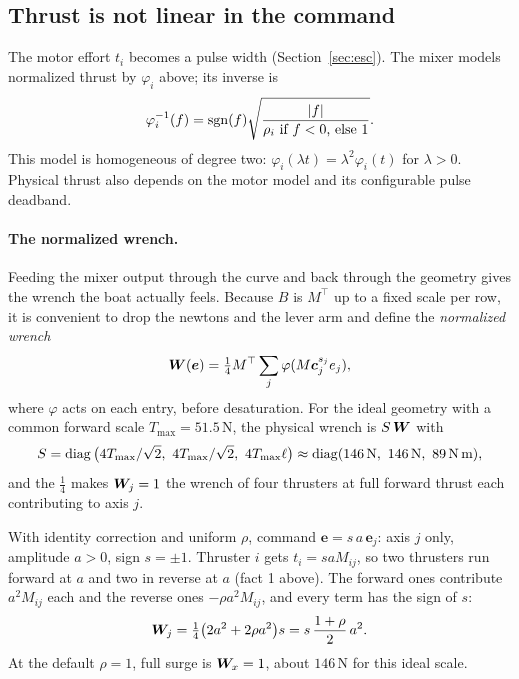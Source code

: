 \subsection{Thrust is not linear in the command}
\label{sec:corr-phi}

The motor effort $t_i$ becomes a pulse width (Section~\ref{sec:esc}). The
mixer models normalized thrust by $\varphi_i$ above; its inverse is
\[
  \varphi_i^{-1}(f)=\sgn(f)\sqrt{\frac{|f|}{\rho_i\ \text{if }f<0\text{, else }1}}.
\]
This model is homogeneous of degree two:
$\varphi_i(\lambda t)=\lambda^2\varphi_i(t)$ for $\lambda>0$.
Physical thrust also depends on the motor model and its configurable pulse deadband.

\paragraph{The normalized wrench.} Feeding the mixer output through the curve
and back through the geometry gives the wrench the boat actually feels. Because
$B$ is $M^\top$ up to a fixed scale per row, it is convenient to drop the
newtons and the lever arm and define the \emph{normalized wrench}
\[
  \bm{W}(\bm e)=\tfrac14 M^\top\sum_j\varphi(M\bm c_j^{s_j}e_j),
\]
where $\varphi$ acts on each entry, before desaturation. For the ideal
geometry with a common forward scale $T_{\max}=51.5$\,N, the physical wrench is $S\,\bm{W}$ with
\[
  S = \diag\big(4T_{\max}/\sqrt2,\ 4T_{\max}/\sqrt2,\ 4T_{\max}\ell\big)
  \approx \diag(146\,\text{N},\ 146\,\text{N},\ 89\,\text{N\,m}),
\]
and the $\tfrac14$ makes $\bm{W}_j = 1$ the wrench of four thrusters at full forward thrust each
contributing to axis $j$.

\begin{example}
With identity correction and uniform $\rho$, command $\bm e = s\,a\,\bm e_j$: axis $j$ only, amplitude $a > 0$, sign
$s = \pm1$. Thruster $i$ gets $t_i = s a M_{ij}$, so two thrusters run forward
at $a$ and two in reverse at $a$ (fact 1 above). The forward ones contribute
$a^2 M_{ij}$ each and the reverse ones $-\rho a^2 M_{ij}$, and every term has the
sign of $s$:
\[
  \bm{W}_j = \tfrac14\big(2a^2 + 2\rho a^2\big)s = s\,\frac{1+\rho}{2}\,a^2 .
\]
At the default $\rho=1$, full surge is $\bm{W}_x=1$, about $146$\,N
for this ideal scale.
\end{example}

